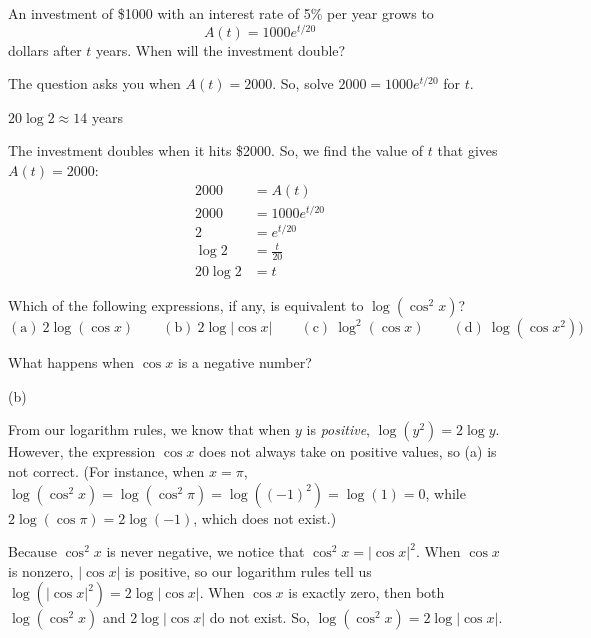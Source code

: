\begin{Mquestion}
An investment of \$1000 with an interest rate of 5\% per year grows to
\[A(t)=1000e^{t/20}\]
dollars after $t$ years. When will the investment double?
\end{Mquestion}
\begin{hint}
The question asks you when $A(t)=2000$. So, solve $2000=1000e^{t/20}$ for $t$.
\end{hint}
\begin{answer}
$20\log2 \approx 14$ years
\end{answer}
\begin{solution}
The investment doubles when it hits \$2000. So, we find the value of  $t$
that gives $A(t)=2000$:
\begin{align*}
2000&=A(t)\\
2000&=1000e^{t/20}\\
2&=e^{t/20}\\
\log 2 &=\frac{t}{20}\\
20\log2&=t
\end{align*}
\end{solution}


\begin{Mquestion}
Which of the following expressions, if any, is equivalent to $\log\left(\cos^2 x\right)$?
\[(\mbox{a})~ 2\log(\cos x) \qquad (\mbox{b})~ 2\log|\cos x | \qquad (\mbox{c})~ \log^2(\cos x) \qquad (\mbox{d})~\log(\cos x^2))\]
\end{Mquestion}
\begin{hint}
What happens when $\cos x$ is a negative number?
\end{hint}
\begin{answer}
(b)
\end{answer}
\begin{solution}
From our logarithm rules, we know that when $y$ is \emph{positive}, $\log (y^2)=2\log y$. However, the expression $\cos x$ does not always take on positive values, so (a) is not correct. (For instance, when $x=\pi$, $\log(\cos^2 x)=\log(\cos^2\pi)=\log\left((-1)^2\right) = \log(1)=0$, while $2\log (\cos \pi)=2\log(-1)$, which does not exist.)

Because $\cos^2 x$ is never negative, we notice that $\cos^2 x = |\cos x|^2$. When $\cos x$ is nonzero, $|\cos x|$ is positive, so our logarithm rules tell us $\log\left(|\cos x|^2\right) =2\log|\cos x |$. When $\cos x$ is exactly zero, then both $\log(\cos^2x)$ and $2\log|\cos x|$ do not exist. So, $\log(\cos^2x) = 2\log|\cos x|$.
\end{solution}


